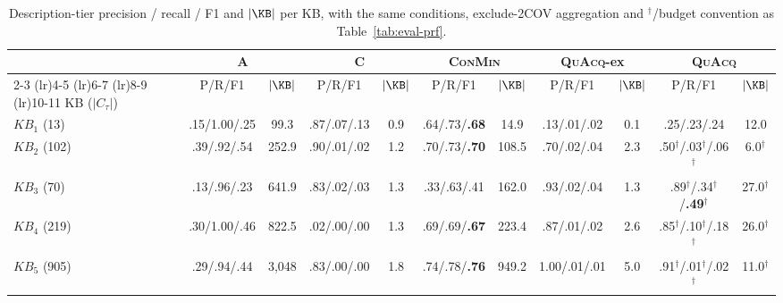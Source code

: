 \begin{table}[t]
\centering
\small
\setlength{\tabcolsep}{4pt}
\begin{tabular}{lcccccccccc}
\toprule
 & \multicolumn{2}{c}{A} & \multicolumn{2}{c}{C} & \multicolumn{2}{c}{\textsc{ConMin}} & \multicolumn{2}{c}{\textsc{QuAcq}-ex} & \multicolumn{2}{c}{\textsc{QuAcq}} \tabularnewline
\cmidrule(lr){2-3} \cmidrule(lr){4-5} \cmidrule(lr){6-7} \cmidrule(lr){8-9} \cmidrule(lr){10-11}
KB ($|C_\tau|$) & P/R/F1 & $|\KB|$ & P/R/F1 & $|\KB|$ & P/R/F1 & $|\KB|$ & P/R/F1 & $|\KB|$ & P/R/F1 & $|\KB|$ \tabularnewline
\midrule
$KB_{1}$ (13) & .15/1.00/.25 & 99.3 & .87/.07/.13 & 0.9 & .64/.73/\textbf{.68} & 14.9 & .13/.01/.02 & 0.1 & .25/.23/.24 & 12.0 \tabularnewline
$KB_{2}$ (102) & .39/.92/.54 & 252.9 & .90/.01/.02 & 1.2 & .70/.73/\textbf{.70} & 108.5 & .70/.02/.04 & 2.3 & .50$^{\dagger}$/.03$^{\dagger}$/.06$^{\dagger}$ & 6.0$^{\dagger}$ \tabularnewline
$KB_{3}$ (70) & .13/.96/.23 & 641.9 & .83/.02/.03 & 1.3 & .33/.63/.41 & 162.0 & .93/.02/.04 & 1.3 & .89$^{\dagger}$/.34$^{\dagger}$/\textbf{.49}$^{\dagger}$ & 27.0$^{\dagger}$ \tabularnewline
$KB_{4}$ (219) & .30/1.00/.46 & 822.5 & .02/.00/.00 & 1.3 & .69/.69/\textbf{.67} & 223.4 & .87/.01/.02 & 2.6 & .85$^{\dagger}$/.10$^{\dagger}$/.18$^{\dagger}$ & 26.0$^{\dagger}$ \tabularnewline
$KB_{5}$ (905) & .29/.94/.44 & 3,048 & .83/.00/.00 & 1.8 & .74/.78/\textbf{.76} & 949.2 & 1.00/.01/.01 & 5.0 & .91$^{\dagger}$/.01$^{\dagger}$/.02$^{\dagger}$ & 11.0$^{\dagger}$ \tabularnewline
\bottomrule
\end{tabular}
\caption{Description-tier precision / recall / F1 and $|\KB|$ per KB, with the same conditions, exclude-2COV aggregation and $^{\dagger}$/budget convention as Table~\ref{tab:eval-prf}.}
\label{tab:app-prf-desc}
\end{table}
